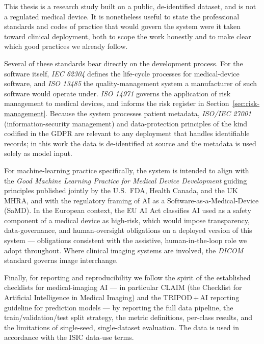 This thesis is a research study built on a public, de-identified dataset, and
is not a regulated medical device. It is nonetheless useful to state the
professional standards and codes of practice that would govern the system
were it taken toward clinical deployment, both to scope the work honestly and
to make clear which good practices we already follow.

Several of these standards bear directly on the development process. For the
software itself, \emph{IEC 62304} defines the life-cycle processes for
medical-device software, and \emph{ISO 13485} the quality-management system a
manufacturer of such software would operate under. \emph{ISO 14971} governs
the application of risk management to medical devices, and informs the risk
register in Section~\ref{sec:risk-management}. Because the system processes
patient metadata, \emph{ISO/IEC 27001} (information-security management) and
data-protection principles of the kind codified in the GDPR are relevant to
any deployment that handles identifiable records; in this work the data is
de-identified at source and the metadata is used solely as model input.

For machine-learning practice specifically, the system is intended to align
with the \emph{Good Machine Learning Practice for Medical Device Development}
guiding principles published jointly by the U.S.\ FDA, Health Canada, and the
UK MHRA, and with the regulatory framing of AI as a Software-as-a-Medical-Device
(SaMD). In the European context, the EU AI Act classifies AI used as a safety
component of a medical device as high-risk, which would impose transparency,
data-governance, and human-oversight obligations on a deployed version of this
system --- obligations consistent with the assistive, human-in-the-loop role
we adopt throughout. Where clinical imaging systems are involved, the
\emph{DICOM} standard governs image interchange.

Finally, for reporting and reproducibility we follow the spirit of the
established checklists for medical-imaging AI --- in particular CLAIM (the
Checklist for Artificial Intelligence in Medical Imaging) and the
TRIPOD\,+\,AI reporting guideline for prediction models --- by reporting the
full data pipeline, the train/validation/test split strategy, the metric
definitions, per-class results, and the limitations of single-seed,
single-dataset evaluation. The data is used in accordance with the ISIC
data-use terms.


